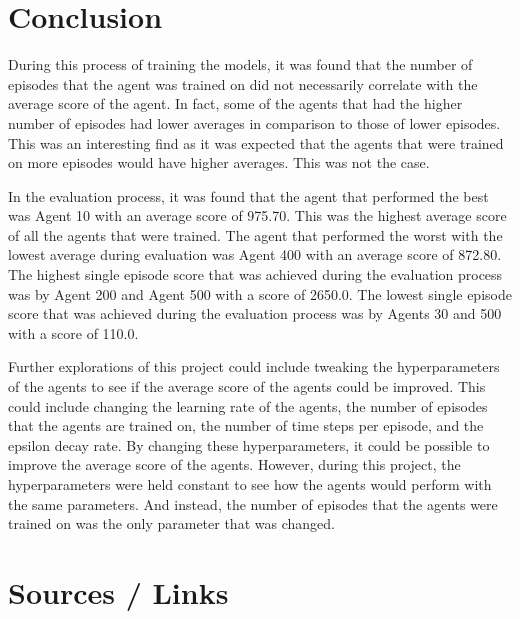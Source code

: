 \documentclass[
	a4paper, %
	10pt, %
	unnumberedsections, %
	twoside, %
]{LTJournalArticle}
\begin{document}
\section{Conclusion}

During this process of training the models, it was found that the number of episodes that the agent was trained on did not necessarily correlate with the average score of the agent. In fact, some of 
the agents that had the higher number of episodes had lower averages in comparison to those of lower episodes. This was an interesting find as it was expected that the agents that were trained on more
episodes would have higher averages. This was not the case.

In the evaluation process, it was found that the agent that performed the best was Agent 10 with an average score of 975.70. This was the highest average score of all the agents that were trained. The
agent that performed the worst with the lowest average during evaluation was Agent 400 with an average score of 872.80. The highest single episode score that was achieved during the evaluation process
was by Agent 200 and Agent 500 with a score of 2650.0. The lowest single episode score that was achieved during the evaluation process was by Agents 30 and 500 with a score of 110.0.

Further explorations of this project could include tweaking the hyperparameters of the agents to see if the average score of the agents could be improved. This could include changing the learning rate of
the agents, the number of episodes that the agents are trained on, the number of time steps per episode, and the epsilon decay rate. By changing these hyperparameters, it could be possible to improve the
average score of the agents. However, during this project, the hyperparameters were held constant to see how the agents would perform with the same parameters. And instead, the number of episodes that the
agents were trained on was the only parameter that was changed.

\newpage

\onecolumn

\section{Sources / Links}
\end{document}

